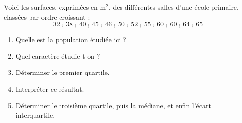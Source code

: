 \begin{exo}
	Voici les surfaces, exprimées en m$^2$, des différentes salles d'une école primaire, classées par ordre croissant :
	\[
		32\ ;\ 38\ ;\ 40\ ;\ 45\ ;\ 46\ ;\ 50\ ;\ 52\ ;\ 55\ ;\ 60\ ;\ 60\ ;\ 64\ ;\ 65
	\]

	\begin{enumerate}
		\item Quelle est la population étudiée ici ?
		\item Quel caractère étudie-t-on ?
		\item Déterminer le premier quartile.
		\item Interpréter ce résultat.
		\item Déterminer le troisième quartile, puis la médiane, et enfin l'écart interquartile.
	\end{enumerate}
\end{exo}
